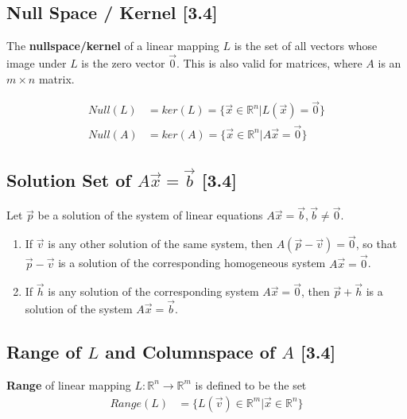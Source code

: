 \documentclass[a4paper,9pt]{extarticle}
\begin{document}
\begin{multicols*}{2}

\subsection{Null Space / Kernel [3.4]}
The \textbf{nullspace/kernel} of a linear mapping $L$ is the set of all vectors whose image under $L$ is the zero vector $\vec{0}$. This is also valid for matrices, where $A$ is an $m \times n$ matrix.

\begin{equation} \label{3.4-1}
    \begin{split}
        Null(L) & = ker(L) = \{\vec{x} \in \mathbb{R}^n | L(\vec{x}) = \vec{0}\} \\
        Null(A) & = ker(A) = \{\vec{x} \in \mathbb{R}^n | A \vec{x} = \vec{0}\}
    \end{split}
\end{equation}


\subsection{Solution Set of $A \vec{x} = \vec{b}$ [3.4]}
Let $\vec{p}$ be a solution of the system of linear equations $A \vec{x} = \vec{b}, \vec{b} \neq \vec{0}$.

\begin{enumerate}[label=\bfseries (\arabic*)] \itemsep0pt \parskip0pt 
    \item If $\vec{v}$ is any other solution of the same system, then $A(\vec{p} - \vec{v}) = \vec{0}$, so that $\vec{p} - \vec{v}$ is a solution of the corresponding homogeneous system $A \vec{x} = \vec{0}$.
    \item If $\vec{h}$ is any solution of the corresponding system $A \vec{x} = \vec{0}$, then $\vec{p} + \vec{h}$ is a solution of the system $A \vec{x} = \vec{b}$.
\end{enumerate}


\subsection{Range of $L$ and Columnspace of $A$ [3.4]}
\textbf{Range} of linear mapping $L: \mathbb{R}^n \to \mathbb{R}^m$ is defined to be the set
\begin{equation} \label{3.4-2}
    \begin{split}
        Range(L) & = \{L(\vec{v}) \in \mathbb{R}^m | \vec{x} \in \mathbb{R}^n\}
    \end{split}
\end{equation}


\end{multicols*}
\end{document}
